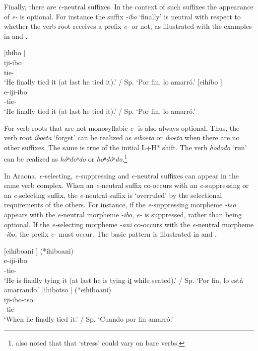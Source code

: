 \documentclass[output=paper,hidelinks]{langscibook}
\begin{document}
Finally, there are \textit{e-}neutral suffixes. In the context of such suffixes the appearance of \textit{e-} is optional. For instance the suffix \textit{-ibo} `finally' is neutral with respect to whether the verb root receives a prefix \textit{e-} or not, as illustrated with the examples in  and .


\ea 
 \ea \label{ex:ijibo}
	  [ihíbo \downarrow] \\
       \gll iji-ibo \\
	    tie-\Final{}  \\
    \glt `He finally tied it (at last he tied it).' / Sp. `Por fin, lo amarró.'
 \ex\label{ex:eijibo}
	  [eihíbo \downarrow] \\
       \gll e-iji-ibo \\
	    \E{}-tie-\Final{}  \\
    \glt `He finally tied it (at last he tied it).' / Sp. `Por fin, lo amarró.'
 \z
\z

For verb roots that are not monosyllabic \textit{e-} is also always optional. Thus, the verb root \textit{iboeta} `forget' can be realized as \textit{eiboeta} or \textit{iboeta} when there are no other suffixes. The same is true of the initial L+H* shift. The verb \textit{hododo} `run' can be realized as \textit{hóⁿdoⁿdo} or \textit{hoⁿdóⁿdo}.\footnote{\citet{pitmanpitman1976} also noted that that `stress' could vary on bare verbs.}

In Araona, \textit{e-}selecting, \textit{e-}suppressing and \textit{e-}neutral suffixes can appear in the same verb complex. When an \textit{e-}neutral suffix co-occurs with an \textit{e-}suppressing or an \textit{e-}selecting suffix, the \textit{e-}neutral suffix is `overruled' by the selectional requirements of the others. For instance, if the \textit{e-}suppressing morpheme \textit{-tso} appears with the \textit{e-}neutral morpheme \textit{-ibo}, \textit{e-} is suppressed, rather than being optional. If the \textit{e-}selecting morpheme \textit{-ani} co-occurs with the \textit{e-}neutral morpheme \textit{-ibo}, the prefix \textit{e-} must occur. The basic pattern is illustrated in  and .

\ea 
 \ea \label{ex:eijiboani}
	  [eihíboani \downarrow] (*ihiboani) \\
       \gll e-iji-ibo \\
	    \E{}-tie-\Final{}  \\
    \glt `He is finally tying it (at last he is tying it̠ while seated).' / Sp. `Por fin, lo está amarrando.'
 \ex \label{ex:ijibotso}
	  [ihibotso \downarrow] (*eihiboani) \\
       \gll iji-ibo-tso \\
	    \E{}-tie-\Final{}-\Ant{}  \\
    \glt `When he finally tied it.' / Sp. `Cuando por fin amarró.'
 \z
\z
\end{document}
